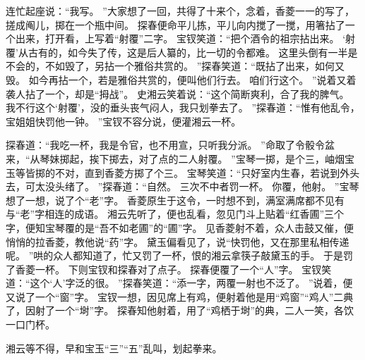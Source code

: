 连忙起座说：“我写。
”大家想了一回，共得了十来个，念着，香菱一一的写了，搓成阄儿，掷在一个瓶中间。
探春便命平儿拣，平儿向内搅了一搅，用箸拈了一个出来，打开看，上写着“射覆”二字。
宝钗笑道：“把个酒令的祖宗拈出来。
‘射覆’从古有的，如今失了传，这是后人纂的，比一切的令都难。
这里头倒有一半是不会的，不如毁了，另拈一个雅俗共赏的。
”探春笑道：“既拈了出来，如何又毁。
如今再拈一个，若是雅俗共赏的，便叫他们行去。
咱们行这个。
”说着又着袭人拈了一个，却是“拇战”。
史湘云笑着说：“这个简断爽利，合了我的脾气。
我不行这个‘射覆’，没的垂头丧气闷人，我只划拳去了。
”探春道：“惟有他乱令，宝姐姐快罚他一钟。
”宝钗不容分说，便灌湘云一杯。
\par
探春道：“我吃一杯，我是令官，也不用宣，只听我分派。
”命取了令骰令盆来，“从琴妹掷起，挨下掷去，对了点的二人射覆。
”宝琴一掷，是个三，岫烟宝玉等皆掷的不对，直到香菱方掷了个三。
宝琴笑道：“只好室内生春，若说到外头去，可太没头绪了。
”探春道：“自然。
三次不中者罚一杯。
你覆，他射。
”宝琴想了一想，说了个“老”字。
香菱原生于这令，一时想不到，满室满席都不见有与“老”字相连的成语。
湘云先听了，便也乱看，忽见门斗上贴着“红香圃”三个字，便知宝琴覆的是“吾不如老圃”的“圃”字。
见香菱射不着，众人击鼓又催，便悄悄的拉香菱，教他说“药”字。
黛玉偏看见了，说“快罚他，又在那里私相传递呢。
”哄的众人都知道了，忙又罚了一杯，恨的湘云拿筷子敲黛玉的手。
于是罚了香菱一杯。
下则宝钗和探春对了点子。
探春便覆了一个“人”字。
宝钗笑道：“这个‘人’字泛的很。
”探春笑道：“添一字，两覆一射也不泛了。
”说着，便又说了一个“窗”字。
宝钗一想，因见席上有鸡，便射着他是用“鸡窗”“鸡人”二典了，因射了一个“埘”字。
探春知他射着，用了“鸡栖于埘”的典，二人一笑，各饮一口门杯。
\par
湘云等不得，早和宝玉“三”“五”乱叫，划起拳来。
